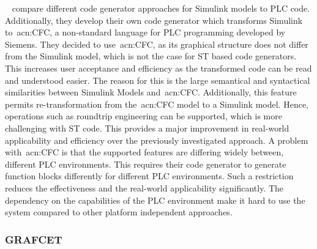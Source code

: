 \citeauthor{6489667}~\cite{6489667} compare different code generator approaches for Simulink models to PLC code.
Additionally, they develop their own code generator which transforms Simulink to~\acrfull{acn:CFC}, a non-standard language for PLC programming developed by Siemens.
They decided to use~\acrshort{acn:CFC}, as its graphical structure does not differ from the Simulink model, which is not the case for ST based code generators.
This increases user acceptance and efficiency as the transformed code can be read and understood easier.
The reason for this is the large semantical and syntactical similarities between Simulink Models and~\acrshort{acn:CFC}.
Additionally, this feature permits re-transformation from the~\acrshort{acn:CFC} model to a Simulink model.
Hence, operations such as roundtrip engineering can be supported, which is more challenging with ST code.
This provides a major improvement in real-world applicability and efficiency over the previously investigated approach.
A problem with~\acrshort{acn:CFC} is that the supported features are differing widely between, different PLC environments.
This requires their code generator to generate function blocks differently for different PLC environments.
Such a restriction reduces the effectiveness and the real-world applicability significantly.
The dependency on the capabilities of the PLC environment make it hard to use the system compared to other platform independent approaches.

\subsubsection{GRAFCET}
\label{sec:sub:grafcet}

